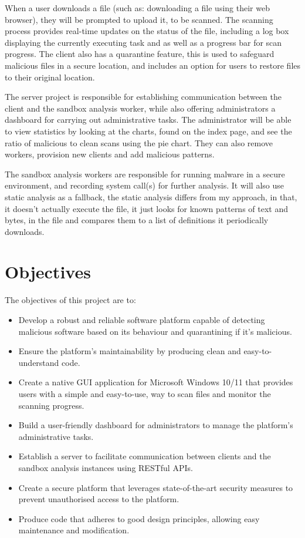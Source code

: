 When a user downloads a file
(such as: downloading a file using their web browser),
they will be prompted to upload it, to be scanned.
The scanning process provides real-time updates on the status of the file,
including a log box displaying the currently executing task
and as well as a progress bar for scan progress.
The client also has a quarantine feature,
this is used to safeguard malicious files in a secure location,
and includes an option for users to restore files to their original location.

The server project is responsible for establishing communication
between the client and the sandbox analysis worker,
while also offering administrators a dashboard
for carrying out administrative tasks.
The administrator will be able to view
statistics by looking at the charts, found on the index page,
and see the ratio of malicious to clean scans using the pie chart.
They can also remove workers, provision new clients and add malicious patterns.

The sandbox analysis workers are responsible for running malware in a secure environment,
and recording system call(s) for further analysis.
It will also use static analysis as a fallback,
the static analysis differs from my approach,
in that, it doesn't actually execute the file,
it just looks for known patterns of text and bytes, in the file
and compares them to a list of definitions it periodically downloads.


\section{Objectives}
The objectives of this project are to:
\begin{itemize}
\item Develop a robust and reliable software platform capable of detecting
      malicious software based on its behaviour and quarantining if it's malicious.
\item Ensure the platform's maintainability by producing clean
      and easy-to-understand code.
\item Create a native GUI application for Microsoft Windows 10/11
      that provides users with a simple and easy-to-use,
      way to scan files and monitor the scanning progress.
\item Build a user-friendly dashboard for administrators to manage
      the platform's administrative tasks.
\item Establish a server to facilitate communication between
      clients and the sandbox analysis instances using RESTful APIs.
\item Create a secure platform that leverages state-of-the-art security
      measures to prevent unauthorised access to the platform.
\item Produce code that adheres to good design principles,
      allowing easy maintenance and modification.
\end{itemize}


